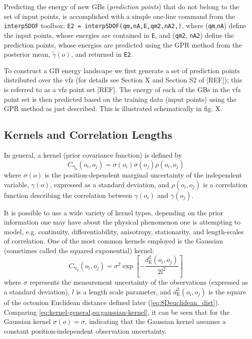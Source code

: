 \documentclass[final,twocolumn,12pt]{elsarticle}
\begin{document}
	Predicting the energy of new GBs (\emph{prediction points}) that do not belong to the set of input points, is accomplished with a simple one-line command from the \texttt{interp5DOF} toolbox: \texttt{E2~=~interp5DOF(qm,nA,E,qm2,nA2,)}, where (\texttt{qm},\texttt{nA}) define the input points, whose energies are contained in \texttt{E}, and (\texttt{qm2}, \texttt{nA2}) define the prediction points, whose energies are predicted using the GPR method from the posterior mean, $\widetilde{\gamma}(o)$, and returned in \texttt{E2}.
	
	To construct a GB energy landscape we first generate a set of prediction points distributed over the \gls{vfz} (for details see Section X and Section S2 of [REF]); this is referred to as a \gls{vfz} point set [REF]. The energy of each of the GBs in the \gls{vfz} point set is then predicted based on the training data (input points) using the GPR method as just described. This is illustrated schematically in fig. X.
	
	\subsection{Kernels and Correlation Lengths}
	\label{sec:methods:kernels-and-correlations}
	In general, a kernel (prior covariance function) is defined by
	\begin{equation}
	\label{eq:kernel-general}
	    C_{\boldsymbol{\gamma}_0}\!\left(o_i,o_j\right) = \sigma\!\left(o_i\right) \sigma\!\left(o_j\right) \rho\!\left(o_i,o_j\right)
	\end{equation}
	where $\sigma\!\left(o\right)$ is the position-dependent marginal uncertainty of the independent variable, $\gamma\!\left(o\right)$, expressed as a standard deviation, and $\rho\!\left(o_i,o_j\right)$ is a correlation function describing the correlation between $\gamma\!\left(o_i\right)$ and $\gamma\!\left(o_j\right)$.
	
	It is possible to use a wide variety of kernel types, depending on the prior information one may have about the physical phenomenon one is attempting to model, e.g. continuity, differentiability, anisotropy, stationarity, and length-scales of correlation. One of the most common kernels employed is the Gaussian (sometimes called the squared exponential) kernel:
	\begin{equation}
	\label{eq:gaussian-kernel}
	    C_{\boldsymbol{\gamma}_0}\!\left(o_i,o_j\right) = {\sigma}^2 \exp{\left[-\frac{d_{\text{E}}^2\!\left(o_i,o_j\right)}{2{l}^2}\right]}
    \end{equation}
    where $\sigma$ represents the measurement uncertainty of the observations (expressed as a standard deviation), $l$ is a length scale parameter, and $d_{\text{E}}^2\!\left(o_i,o_j\right)$ is the square of the octonion Euclidean distance defined later (\cref{eq:8Deuclidean_dist}). Comparing \cref{eq:kernel-general,eq:gaussian-kernel}, it can be seen that for the Gaussian kernel $\sigma\!\left(o\right) = \sigma$, indicating that the Gaussian kernel assumes a constant position-independent observation uncertainty.
    
\end{document}
